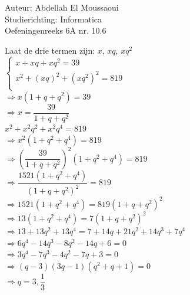 \documentclass[a4paper]{article}
\begin{document}
  
\noindent \large Auteur: Abdellah El Moussaoui \\
\noindent \large Studierichting: Informatica\\
\noindent \large Oefeningenreeks 6A nr. 10.6\\

\medskip

\normalsize

Laat de drie termen zijn: $x$, $xq$, $xq^2$\\

$\left\{
\begin{array}{l}
x+xq+xq^2 = 39\\
x^2+\left(xq\right)^2+\left(xq^2\right)^2 = 819\\
\end{array}
\right.$\\

$\Rightarrow x\left(1+q+q^2\right) = 39$\\

$\Rightarrow x=\dfrac{39}{1+q+q^2}$\\

$x^2+x^2q^2+x^2q^4=819$\\

$\Rightarrow x^2\left(1+q^2+q^4\right)=819$\\

$\Rightarrow \left(\dfrac{39}{1+q+q^2}\right)^2 \left(1+q^2+q^4\right)=819$\\

$\Rightarrow \dfrac{1521 \left(1+q^2+q^4\right)}{\left(1+q+q^2\right)^2}=819$\\

$\Rightarrow 1521 \left(1+q^2+q^4\right)=819\left(1+q+q^2\right)^2$\\

$\Rightarrow 13 \left(1+q^2+q^4\right)=7 \left(1+q+q^2\right)^2$\\

$\Rightarrow 13+13q^2+13q^4=7+14q+21q^2+14q^3+7q^4$\\

$\Rightarrow 6q^4-14q^3-8q^2-14q+6=0$\\

$\Rightarrow 3q^4-7q^3-4q^2-7q+3=0$\\

$\Rightarrow \left(q-3\right)\left(3q-1\right) \left(q^2+q+1\right)=0$\\

$\Rightarrow q=3,\dfrac{1}{3}$\\
\end{document}
